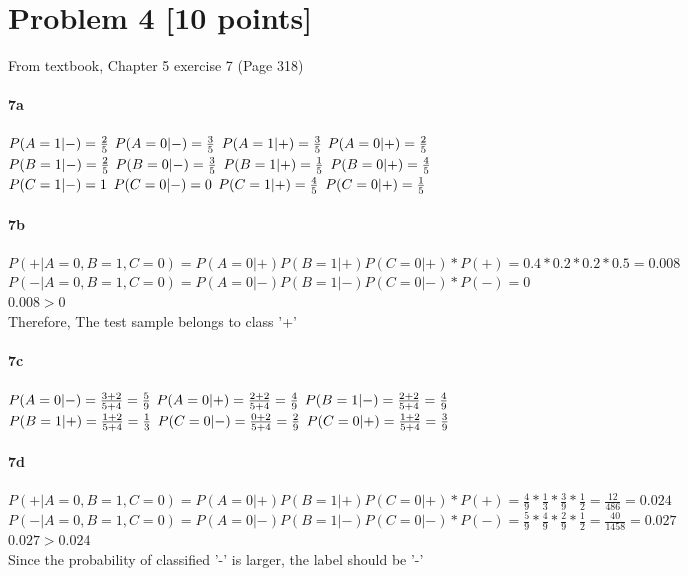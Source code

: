 \documentclass{article}
\begin{document}
\section*{Problem 4 [10 points]} 

From textbook, Chapter 5 exercise 7 (Page 318)
\paragraph{7a}
$P(A = 1| -)=\frac{2}{5}\\$
$P(A = 0| -)= \frac{3}{5}\\$
$P(A = 1| +) = \frac{3}{5}\\$
$P(A = 0| +) = \frac{2}{5}\\$
$P(B = 1| -)=\frac{2}{5}\\$
$P(B = 0| -)=\frac{3}{5}\\$
$P(B = 1| +) = \frac{1}{5}\\$
$P(B = 0| +) = \frac{4}{5}\\$
$P(C = 1| -) = 1\\$
$P(C = 0| -) = 0\\$
$P(C = 1| +) = \frac{4}{5}\\$
$P(C = 0| +) = \frac{1}{5}\\$
\paragraph{7b}
$P(+|A=0, B=1,C=0) = P(A = 0|+)P(B = 1|+)P(C = 0|+) * P(+) = 0.4 * 0.2 * 0.2 * 0.5 = 0.008$\\
$P(-|A=0, B=1,C=0) = P(A = 0| -)P(B = 1| -)P(C = 0| -) * P(-) = 0$\\
$0.008 > 0$\\
Therefore, The test sample belongs to class '+'
\paragraph{7c}
$P(A = 0| -) = \frac{3 + 2}{5 + 4} = \frac{5}{9}\\$
$P(A = 0| +) = \frac{2 + 2}{5 + 4} = \frac{4}{9}\\$
$P(B = 1| -) = \frac{2 + 2}{5 + 4} = \frac{4}{9}\\$
$P(B = 1| +) = \frac{1 + 2}{5 + 4} = \frac{1}{3}\\$
$P(C = 0| -) = \frac{0 + 2}{5 + 4} = \frac{2}{9}\\$
$P(C = 0| +) = \frac{1 + 2}{5 + 4} = \frac{3}{9}\\$
\paragraph{7d}
$P(+|A=0, B=1,C=0) = P(A = 0|+)P(B = 1|+)P(C = 0|+) * P(+) = \frac{4}{9} * \frac{1}{3} * \frac{3}{9} * \frac{1}{2} = \frac{12}{486} = 0.024$\\
$P(-|A=0, B=1,C=0) = P(A = 0| -)P(B = 1| -)P(C = 0| -) * P(-) =  \frac{5}{9} * \frac{4}{9} * \frac{2}{9} * \frac{1}{2} = \frac{40}{1458} = 0.027$\\
$0.027 > 0.024$\\
Since the probability of classified '-' is larger, the label should be '-'
\end{document}
